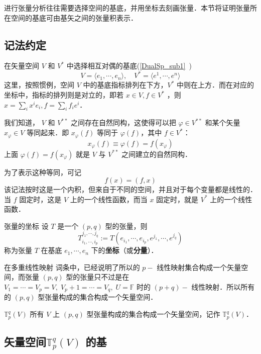 
进行张量分析往往需要选择空间的基底，并用坐标去刻画张量．本节将证明张量所在空间的基底可由基矢之间的张量积表示．
\subsection{记法约定}
在矢量空间 $V$ 和 $V^*$ 中选择相互对偶的基底(\autoref{DualSp_sub1}~)
\begin{equation}
V=\langle e_1,\cdots ,e_n\rangle,\quad V^*=\langle e^1,\cdots,e^n\rangle
\end{equation}
这里，按照惯例，空间 $V$ 中的基底指标排列在下方，$V^*$ 中则在上方．而在对应的坐标中，指标的排列则是对立的，即若 $x\in V,f\in V^*$ ，则 $x=\sum_{i}x^i e_i,f=\sum_{i}f_ie^i$．

我们知道， $V$ 和 $V^{**}$ 之间存在自然同构，这使得可以把 $\varphi\in V^{**}$ 和某个矢量 $x_{\varphi}\in V$ 等同起来．即 $x_{\varphi}(f)$ 等同于 $\varphi(f)$，其中 $f\in V^*$：
\begin{equation}
x_{\varphi}(f)\equiv\varphi(f)=f(x_{\varphi})
\end{equation}
上面 $\varphi(f)=f(x_{\varphi})$ 就是 $V$ 与 $V^{**}$ 之间建立的自然同构．

为了表示这种等同，可记
\begin{equation}
f(x)=(f,x)
\end{equation}
该记法按时这是一个内积，但来自于不同的空间，并且对于每个变量都是线性的．当 $f$ 固定时，这是 $V$ 上的一个线性函数，而当 $x$ 固定时，就是 $V^{*}$ 上的一个线性函数．
\begin{definition}{张量的坐标}
设 $T$ 是一个 $(p,q)$ 型的张量，则
\begin{equation}
T^{j_1,\cdots,j_q}_{i_1,\cdots,i_p}:=T(e_{i_1},\cdots,e_{i_p},e^{j_1},\cdots,e^{j_q})
\end{equation}
称为张量 $T$ 在基底 ${e_1,\cdots,e_n}$ 下的\textbf{坐标}（或\textbf{分量}）．
\end{definition}

在多重线性映射 词条中，已经说明了所以的 $p-$ 线性映射集合构成一个矢量空间，而张量 $(p,q)$ 型的张量只不过是在 $V_1=\cdots=V_p=V,\;V_p+1=\cdots=V_q,\;U=\mathbb F$ 时的 $(p+q)-$ 线性映射．所以所有的 $(p,q)$ 型张量构成的集合构成一个矢量空间．
\begin{definition}{$\mathbb T^q_p(V)$}
所有 $V$ 上 $(p,q)$ 型张量构成的集合构成一个矢量空间，记作 $\mathbb T^q_p(V)$．
\end{definition} 
\subsection{矢量空间$\mathbb T^q_p(V)$ 的基}
